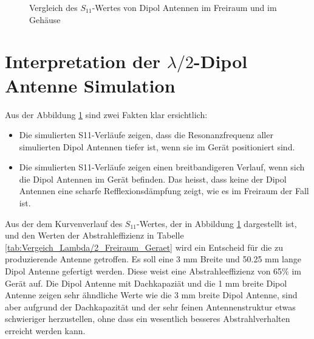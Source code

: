 \begin{figure}[!ht]
	\centering
	\begingroup
	
	\endgroup
	\caption{Vergleich des $S_{11}$-Wertes von Dipol Antennen im Freiraum und im Gehäuse}	
	\label{S11_Vergleich_Simulation_Dipolantenn_freiraum_Geraet}
\end{figure}


\newpage
\section{Interpretation der $\lambda/2$-Dipol Antenne Simulation}
\label{sec:Interpretation_Dipol}

Aus der Abbildung \ref{S11_Vergleich_Simulation_Dipolantenn_freiraum_Geraet} sind zwei Fakten klar ersichtlich: 
\begin{itemize}
\item Die simulierten S11-Verläufe zeigen, dass die Resonanzfrequenz aller simulierten Dipol Antennen tiefer ist, wenn sie im Gerät positioniert sind.
\item Die simulierten S11-Verläufe zeigen einen breitbandigeren Verlauf, wenn sich die Dipol Antennen im Gerät befinden. Das heisst, dass keine der Dipol Antennen  eine scharfe Refflexionsdämpfung zeigt, wie es im Freiraum der Fall ist. 
\end{itemize}
Aus der dem Kurvenverlauf des $S_{11}$-Wertes, der in Abbildung \ref{S11_Vergleich_Simulation_Dipolantenn_freiraum_Geraet} dargestellt ist, und den Werten der Abstrahleffizienz in Tabelle \ref{tab:Vergeich_Lambda/2_Freiraum_Geraet} wird ein Entscheid für die zu produzierende Antenne getroffen. Es soll eine 3 mm Breite und 50.25 mm lange Dipol Antenne gefertigt werden. Diese weist eine Abstrahleeffizienz von 65$\%$ im Gerät auf. Die Dipol Antenne mit Dachkapaziät und die 1 mm breite Dipol Antenne zeigen sehr ähndliche Werte wie die 3 mm breite Dipol Antenne, sind aber aufgrund der Dachkapazität und der sehr feinen Antennenstruktur etwas schwieriger herzustellen, ohne dass ein wesentlich besseres Abstrahlverhalten erreicht werden kann.
